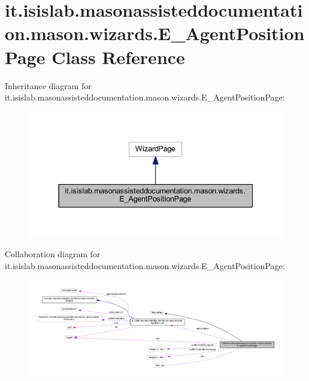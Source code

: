 \hypertarget{classit_1_1isislab_1_1masonassisteddocumentation_1_1mason_1_1wizards_1_1_e___agent_position_page}{\section{it.\-isislab.\-masonassisteddocumentation.\-mason.\-wizards.\-E\-\_\-\-Agent\-Position\-Page Class Reference}
\label{classit_1_1isislab_1_1masonassisteddocumentation_1_1mason_1_1wizards_1_1_e___agent_position_page}
}


Inheritance diagram for it.\-isislab.\-masonassisteddocumentation.\-mason.\-wizards.\-E\-\_\-\-Agent\-Position\-Page\-:
\nopagebreak
\begin{figure}[H]
\begin{center}
\leavevmode
\includegraphics[width=337pt]{classit_1_1isislab_1_1masonassisteddocumentation_1_1mason_1_1wizards_1_1_e___agent_position_page__inherit__graph}
\end{center}
\end{figure}


Collaboration diagram for it.\-isislab.\-masonassisteddocumentation.\-mason.\-wizards.\-E\-\_\-\-Agent\-Position\-Page\-:
\nopagebreak
\begin{figure}[H]
\begin{center}
\leavevmode
\includegraphics[width=350pt]{classit_1_1isislab_1_1masonassisteddocumentation_1_1mason_1_1wizards_1_1_e___agent_position_page__coll__graph}
\end{center}
\end{figure}

